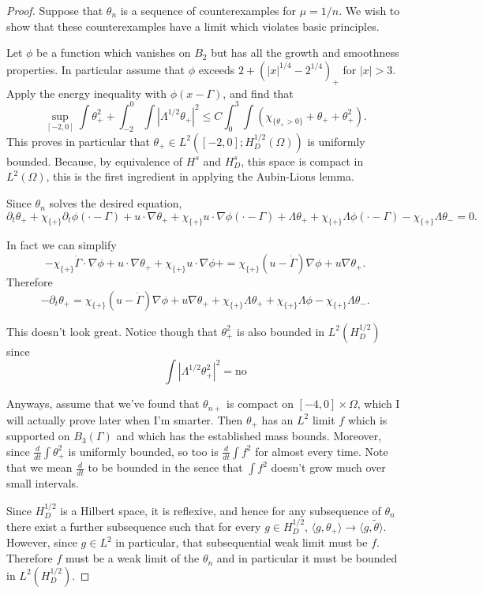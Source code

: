 \documentclass[11pt]{amsart}
\theoremstyle{remark}
\newcommand{\chevron}[1]{\langle #1 \rangle}
\newcommand{\paren}[1]{\left( #1 \right)}
\newcommand{\abs}[1]{\left\lvert #1 \right\rvert}
\newcommand{\del}{\partial}
\newcommand{\grad}{\nabla}
\newcommand{\ddt}{\frac{d}{dt}}
\newcommand{\indic}[1]{\chi_{\{#1\}}}
\begin{document}
\begin{proof}
Suppose that $\theta_n$ is a sequence of counterexamples for $\mu = 1/n$.  We wish to show that these counterexamples have a limit which violates basic principles.  

Let $\phi$ be a function which vanishes on $B_2$ but has all the growth and smoothness properties.  In particular assume that $\phi$ exceeds $2 + \paren{|x|^{1/4}-2^{1/4}}_+$ for $|x|>3$.  Apply the energy inequality with $\phi(x-\Gamma)$, and find that
\[ \sup_{[-2,0]} \int \theta_+^2 + \int_{-2}^0 \int \abs{\Lambda^{1/2}\theta_+}^2 \leq C \int_0^3 \int \paren{\indic{\theta_+>0} + \theta_+ + \theta_+^2}. \]
This proves in particular that $\theta_+ \in L^2([-2,0]; H_D^{1/2}(\Omega))$ is uniformly bounded.  Because, by equivalence of $H^s$ and $H^s_D$, this space is compact in $L^2(\Omega)$, this is the first ingredient in applying the Aubin-Lions lemma.  

Since $\theta_n$ solves the desired equation, 
\[ \del_t \theta_+ + \indic{+}\del_t \phi(\cdot-\Gamma) + u\cdot\grad\theta_+ + \indic{+}u\cdot\grad\phi(\cdot-\Gamma) + \Lambda \theta_+ + \indic{+} \Lambda\phi(\cdot-\Gamma) - \indic{+}\Lambda\theta_- = 0. \]

In fact we can simplify
\[ -\indic{+} \dot{\Gamma} \cdot\grad\phi + u\cdot\grad\theta_+ + \indic{+} u\cdot\grad\phi + = \indic{+} (u - \dot{\Gamma})\grad\phi + u\grad\theta_+. \]
Therefore
\[ -\del_t\theta_+ = \indic{+} (u - \dot{\Gamma})\grad\phi + u\grad\theta_+ + \indic{+}\Lambda \theta_+ + \indic{+}\Lambda\phi - \indic{+}\Lambda \theta_-. \]

This doesn't look great.  Notice though that $\theta_+^2$ is also bounded in $L^2(H_D^{1/2})$ since
\[ \int \abs{\Lambda^{1/2} \theta_+^2}^2 = \textrm{no} \]

Anyways, assume that we've found that $\theta_{n+}$ is compact on $[-4,0]\times\Omega$, which I will actually prove later when I'm smarter.  Then $\theta_+$ has an $L^2$ limit $f$ which is supported on $B_3(\Gamma)$ and which has the established mass bounds.  Moreover, since $\ddt \int \theta_+^2$ is uniformly bounded, so too is $\ddt \int f^2$ for almost every time.  Note that we mean $\ddt$ to be bounded in the sence that $\int f^2$ doesn't grow much over small intervals.  

Since $H_D^{1/2}$ is a Hilbert space, it is reflexive, and hence for any subsequence of $\theta_n$ there exist a further subsequence such that for every $g \in H_D^{1/2}$, $\chevron{g,\theta_+} \to \chevron{g,\tilde{\theta}}$.  However, since $g \in L^2$ in particular, that subsequential weak limit must be $f$.  Therefore $f$ must be a weak limit of the $\theta_n$ and in particular it must be bounded in $L^2(H_D^{1/2})$.  


\end{proof}
\end{document}
